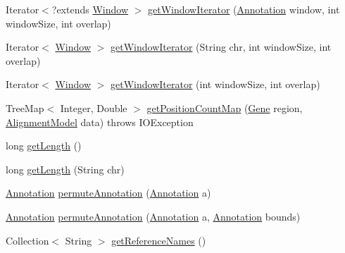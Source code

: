 \begin{DoxyCompactItemize}
\item 
Iterator$<$?extends \hyperlink{interfaceumms_1_1core_1_1feature_1_1_window}{Window} $>$ \hyperlink{classumms_1_1core_1_1coordinatesystem_1_1_transcriptome_space_a1c3ba44a668e043a094bd9f4b5fc87c9}{get\+Window\+Iterator} (\hyperlink{interfaceumms_1_1core_1_1annotation_1_1_annotation}{Annotation} window, int window\+Size, int overlap)
\item 
Iterator$<$ \hyperlink{interfaceumms_1_1core_1_1feature_1_1_window}{Window} $>$ \hyperlink{classumms_1_1core_1_1coordinatesystem_1_1_transcriptome_space_addeb9ed0da55727e8946943a17056541}{get\+Window\+Iterator} (String chr, int window\+Size, int overlap)
\item 
Iterator$<$ \hyperlink{interfaceumms_1_1core_1_1feature_1_1_window}{Window} $>$ \hyperlink{classumms_1_1core_1_1coordinatesystem_1_1_transcriptome_space_abe2bf4806426c7074fb585f85d0632db}{get\+Window\+Iterator} (int window\+Size, int overlap)
\item 
Tree\+Map$<$ Integer, Double $>$ \hyperlink{classumms_1_1core_1_1coordinatesystem_1_1_transcriptome_space_a7dc129bef498e547154553c2e6ccf067}{get\+Position\+Count\+Map} (\hyperlink{classumms_1_1core_1_1annotation_1_1_gene}{Gene} region, \hyperlink{classumms_1_1core_1_1model_1_1_alignment_model}{Alignment\+Model} data)  throws I\+O\+Exception 
\item 
long \hyperlink{classumms_1_1core_1_1coordinatesystem_1_1_transcriptome_space_a06905b39f4cf215f2f38d98f2bb9838f}{get\+Length} ()
\item 
long \hyperlink{classumms_1_1core_1_1coordinatesystem_1_1_transcriptome_space_a9a6afd7255dc26e2ade6d5e0c5a10cd3}{get\+Length} (String chr)
\item 
\hyperlink{interfaceumms_1_1core_1_1annotation_1_1_annotation}{Annotation} \hyperlink{classumms_1_1core_1_1coordinatesystem_1_1_transcriptome_space_aa8c3e12d74fe7ab650ad70b4e5962017}{permute\+Annotation} (\hyperlink{interfaceumms_1_1core_1_1annotation_1_1_annotation}{Annotation} a)
\item 
\hyperlink{interfaceumms_1_1core_1_1annotation_1_1_annotation}{Annotation} \hyperlink{classumms_1_1core_1_1coordinatesystem_1_1_transcriptome_space_ad27dc9d63cf67027a99aedf5587feeb0}{permute\+Annotation} (\hyperlink{interfaceumms_1_1core_1_1annotation_1_1_annotation}{Annotation} a, \hyperlink{interfaceumms_1_1core_1_1annotation_1_1_annotation}{Annotation} bounds)
\item 
Collection$<$ String $>$ \hyperlink{classumms_1_1core_1_1coordinatesystem_1_1_transcriptome_space_a863507c0d75e79e7565ca8e01dd03265}{get\+Reference\+Names} ()

\end{DoxyCompactItemize}
